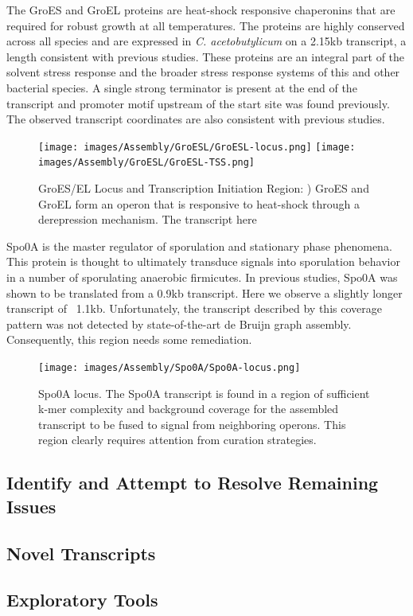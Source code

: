The GroES and GroEL proteins are heat-shock responsive chaperonins that are required for robust growth at all temperatures. The proteins are highly conserved across all species and are expressed in \textit{C. acetobutylicum} on a 2.15kb transcript, a length consistent with previous studies. These proteins are an integral part of the solvent stress response and the broader stress response systems of this and other bacterial species. A single strong terminator is present at the end of the transcript and promoter motif upstream of the start site was found previously. The observed transcript coordinates are also consistent with previous studies.
\begin{figure}
{\texttt{[image: images/Assembly/GroESL/GroESL-locus.png]}
\label{fig:5a}}
{\texttt{[image: images/Assembly/GroESL/GroESL-TSS.png]}
\label{fig:5b}}
\caption{GroES/EL Locus and Transcription Initiation Region: ) GroES and GroEL form an operon that is responsive to heat-shock through a derepression mechanism. The transcript here}
\end{figure}

Spo0A is the master regulator of sporulation and stationary phase phenomena. This protein is thought to ultimately transduce signals into sporulation behavior in a number of sporulating anaerobic firmicutes. In previous studies, Spo0A was shown to be translated from a 0.9kb transcript. Here we observe a slightly longer transcript of ~1.1kb. Unfortunately, the transcript described by this coverage pattern was not detected by state-of-the-art de Bruijn graph assembly. Consequently, this region needs some remediation.

\begin{figure}
\texttt{[image: images/Assembly/Spo0A/Spo0A-locus.png]}
\caption{Spo0A locus. The Spo0A transcript is found in a region of sufficient k-mer complexity and background coverage for the assembled transcript to be fused to signal from neighboring operons. This region clearly requires attention from curation strategies.}
\end{figure}
\subsection{Identify and Attempt to Resolve Remaining Issues}

\subsection{Novel Transcripts}

\subsection{Exploratory Tools}


